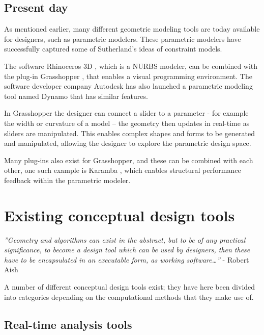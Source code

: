 \subsection{Present day}
As mentioned earlier, many different geometric modeling tools are today available for designers, such as parametric modelers. These parametric modelers have successfully captured some of Sutherland’s ideas of constraint models. 

The software Rhinoceros 3D \cite{Rhino}, which is a NURBS modeler, can be combined with the plug-in Grasshopper \cite{Grasshopper}, that enables a visual programming environment. The software developer company Autodesk has also launched a parametric modeling tool named Dynamo \cite{Dynamo} that has similar features.


In Grasshopper the designer can connect a slider to a parameter - for example the width or curvature of a model – the geometry then updates in real-time as sliders are manipulated. This enables complex shapes and forms to be generated and manipulated, allowing the designer to explore the parametric design space. 

Many plug-ins also exist for Grasshopper, and these can be combined with each other, one such example is Karamba \cite{Karamba}, which enables structural performance feedback within the parametric modeler. 

\section{Existing conceptual design tools}

\textit{''Geometry and algorithms can exist in the abstract, but to be of any practical significance, to become a design tool which can be used by designers, then these have to be encapsulated in an executable form, as working software…''} - Robert Aish \cite{Shea2005}

A number of different conceptual design tools exist; they have here been divided into categories depending on the computational methods that they make use of.

\subsection{Real-time analysis tools}

